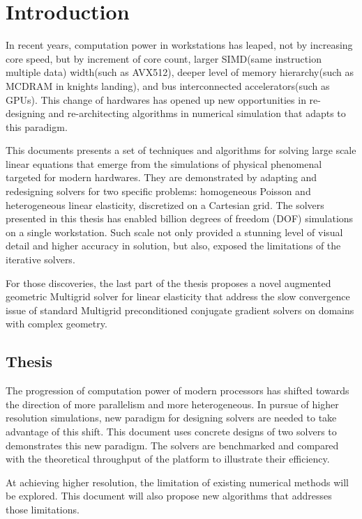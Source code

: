 \chapter{Introduction}
In recent years, computation power in workstations has leaped, not by increasing core speed,  but by increment of core count, larger SIMD(same instruction multiple data) width(such as AVX512), deeper level of memory hierarchy(such as MCDRAM in knights landing), and bus interconnected accelerators(such as GPUs). This change of hardwares has opened up new opportunities in re-designing and re-architecting algorithms in numerical simulation that adapts to this paradigm.

This documents presents a set of techniques and algorithms for solving large scale linear equations that emerge from the simulations of physical phenomenal targeted for modern hardwares. They are demonstrated by adapting and redesigning solvers for two specific problems: homogeneous Poisson and heterogeneous linear elasticity, discretized on a Cartesian grid. The solvers presented  in this thesis has enabled billion degrees of freedom (DOF) simulations on a single workstation. Such scale not only provided a stunning level of visual detail and higher accuracy in solution, but also, exposed the limitations of the iterative solvers.

For those discoveries, the last part of the thesis proposes a novel augmented geometric Multigrid solver for linear elasticity that address the slow convergence issue of standard Multigrid preconditioned conjugate gradient solvers on domains with complex geometry.

\section{Thesis}

The progression of computation power of modern processors has shifted towards the direction of more parallelism and more heterogeneous. In pursue of higher resolution simulations, new paradigm for designing solvers are needed to take advantage of this shift. This document uses concrete designs of two solvers to demonstrates this new paradigm. The solvers are benchmarked and compared with the theoretical throughput of the platform to illustrate their efficiency.

At achieving higher resolution, the limitation of existing numerical methods will be explored. This document will also propose new algorithms that addresses those limitations. 

